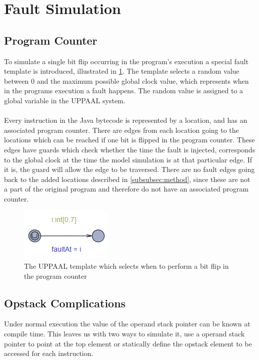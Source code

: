 \section{Fault Simulation}
\subsection{Program Counter}
To simulate a single bit flip occurring in the program's execution a special fault template is introduced, illustrated in \cref{fig:faultTime}. The template selects a random value between $0$ and the maximum possible global clock value, which represents when in the programs execution a fault happens. The random value is assigned to a global variable in the UPPAAL system.\\\\
Every instruction in the Java bytecode is represented by a location, and has an associated program counter. There are edges from each location going to the locations which can be reached if one bit is flipped in the program counter. These edges have guards which check whether the time the fault is injected, corresponds to the global clock at the time the model simulation is at that particular edge. If it is, the guard will allow the edge to be traversed. There are no fault edges going back to the added locations described in \cref{subsubsec:method}, since these are not a part of the original program and therefore do not have an associated program counter.
\begin{figure}[H]
\centering
\includegraphics{figures/fault.PNG}
\caption{The UPPAAL template which selects when to perform a bit flip in the program counter}
\label{fig:faultTime}
\end{figure}


\subsection{Opstack Complications}
Under normal execution the value of the operand stack pointer can be known at compile  time. This leaves us with two ways to simulate it, use a operand stack pointer to point at the top element or statically define the opstack element to be accessed for each instruction.

